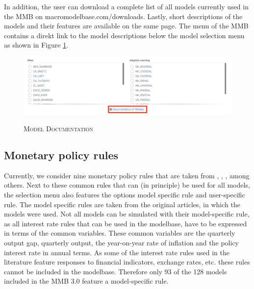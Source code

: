 In addition, the user can download a complete list of all models currently used in the MMB on macromodelbase.com/downloads. Lastly, short descriptions of the models and their features are available on the same page. The menu of the MMB contains a direkt link to the model descriptions below the model selection menu as shown in Figure \ref{docmod}.
\begin{figure}[H]
	\centering
	\caption{\textsc{Model Documentation}}
	\vspace{0.2cm}
	\includegraphics[width=15cm,keepaspectratio]{documentmodels31.png}\\
	\label{docmod}
\end{figure}

\subsection*{Monetary policy rules}



Currently, we consider nine monetary policy rules that are taken from \cite{Taylor1993}, \cite{LevinWielandWilliams2003}, \cite{SmetsWouters2007}, among others. Next to these common rules that can (in principle) be used for all models, the selection menu also features the options model specific rule and user-specific rule. 
The model specific rules are taken from the original articles, in which the models were used. Not all models can be simulated with their model-specific rule, as all interest rate rules that can be used in the modelbase, have to be expressed in terms of the common variables. These common variables are the quarterly output gap, quarterly output, the year-on-year rate of inflation and the policy interest rate in annual terms. As some of the interest rate rules used in the literature feature responses to financial indicators, exchange rates, etc. these rules cannot be included in the modelbase. Therefore only 93 of the 128 models included in the MMB 3.0 feature a model-specific rule. %

